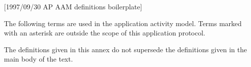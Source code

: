 [1997/09/30 AP AAM definitions boilerplate]

    The following terms are used in the application
activity model. Terms marked with an asterisk are outside
the scope of this application protocol.

    The definitions given in this annex do not supersede
the definitions given in the main body of the text.

\endinput
